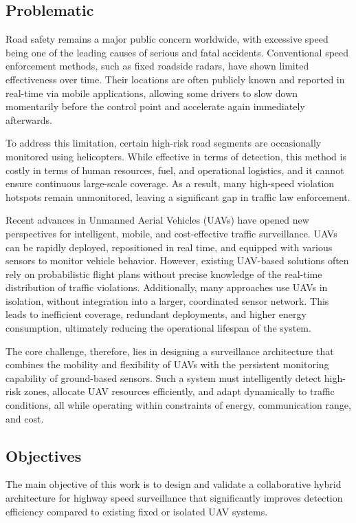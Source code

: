 \subsection*{Problematic}
Road safety remains a major public concern worldwide, with excessive speed being one of the leading causes of serious and fatal accidents. Conventional speed enforcement methods, such as fixed roadside radars, have shown limited effectiveness over time. Their locations are often publicly known and reported in real-time via mobile applications, allowing some drivers to slow down momentarily before the control point and accelerate again immediately afterwards. 

To address this limitation, certain high-risk road segments are occasionally monitored using helicopters. While effective in terms of detection, this method is costly in terms of human resources, fuel, and operational logistics, and it cannot ensure continuous large-scale coverage. As a result, many high-speed violation hotspots remain unmonitored, leaving a significant gap in traffic law enforcement.

Recent advances in Unmanned Aerial Vehicles (UAVs) have opened new perspectives for intelligent, mobile, and cost-effective traffic surveillance. UAVs can be rapidly deployed, repositioned in real time, and equipped with various sensors to monitor vehicle behavior. However, existing UAV-based solutions often rely on probabilistic flight plans without precise knowledge of the real-time distribution of traffic violations. Additionally, many approaches use UAVs in isolation, without integration into a larger, coordinated sensor network. This leads to inefficient coverage, redundant deployments, and higher energy consumption, ultimately reducing the operational lifespan of the system.

The core challenge, therefore, lies in designing a surveillance architecture that combines the mobility and flexibility of UAVs with the persistent monitoring capability of ground-based sensors. Such a system must intelligently detect high-risk zones, allocate UAV resources efficiently, and adapt dynamically to traffic conditions, all while operating within constraints of energy, communication range, and cost.

\subsection*{Objectives}
The main objective of this work is to design and validate a collaborative hybrid architecture for highway speed surveillance that significantly improves detection efficiency compared to existing fixed or isolated UAV systems.

